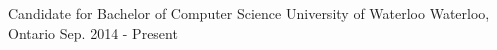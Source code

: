 

\begin{cventries}

  \cventry
    {Candidate for Bachelor of Computer Science} %
    {University of Waterloo} %
    {Waterloo, Ontario} %
    {Sep. 2014 - Present} %
    {
    }

\end{cventries}
